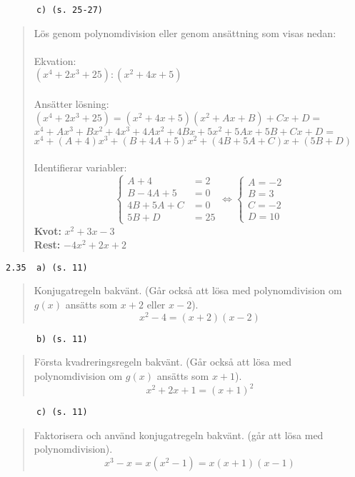 \documentclass[a4paper]{article}
\newcommand{\tskcol}[1]{\textcolor{tskcol}{#1}}
\begin{document}
	\pagebreak
	\texttt{\tskcol{~~~~~~c) (s. 25-27)}}
	\begin{quotation}
		\noindent
		Lös genom polynomdivision eller genom ansättning som visas nedan: \\ \\
		Ekvation: \\
		$(x^4+2x^3+25):(x^2+4x+5)$ \\ \\
		Ansätter lösning: \\
		$(x^4+2x^3+25)=(x^2+4x+5)(x^2+Ax+B)+Cx+D=$ \\
		$x^4+Ax^3+Bx^2+4x^3+4Ax^2+4Bx+5x^2+5Ax+5B+Cx+D=$ \\
		$x^4+(A+4)x^3+(B+4A+5)x^2+(4B+5A+C)x+(5B+D)$ \\ \\
		Identifierar variabler:\\
		\[\begin{cases} 
		A+4&=2 \\ 
		B-4A+5&=0 \\ 
		4B+5A+C&=0 \\
		5B+D&=25
		\end{cases}
		\Leftrightarrow
		\begin{cases} 
		A=-2 \\ 
		B=3 \\
		C=-2 \\
		D=10
		\end{cases}\]
		\textbf{Kvot:} $x^2+3x-3$ \\
		\textbf{Rest:} $-4x^2+2x+2$
	\end{quotation}
	
	\texttt{\tskcol{2.35~~a) (s. 11)}}
	\begin{quotation}
		\noindent
		Konjugatregeln bakvänt. (Går också att lösa med polynomdivision om $g(x)$ ansätts som $x+2$ eller $x-2$).
		\[x^2-4=(x+2)(x-2)\]
	\end{quotation}
	
	\texttt{\tskcol{~~~~~~b) (s. 11)}}
	\begin{quotation}
		\noindent
		Första kvadreringsregeln bakvänt. (Går också att lösa med polynomdivision om $g(x)$ ansätts som $x+1$).
		\[x^2+2x+1=(x+1)^2\]
	\end{quotation}
	
	\texttt{\tskcol{~~~~~~c) (s. 11)}}
	\begin{quotation}
		\noindent
		Faktorisera och använd konjugatregeln bakvänt. (går att lösa med polynomdivision).
		\[x^3-x=x(x^2-1)=x(x+1)(x-1)\]
	\end{quotation}
	
\end{document}
